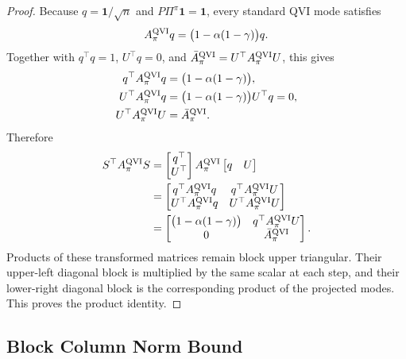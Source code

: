 \documentclass[letterpaper]{article}
\numberwithin{equation}{section}
\begin{document}
\begin{proof}
Because $q=\mathbf{1}/\sqrt n$ and $P\Pi^\pi\mathbf{1}=\mathbf{1}$, every
standard QVI mode satisfies
\begin{align*}
  A_\pi^{\rm QVI}q=\bigl(1-\alpha(1-\gamma)\bigr)q.
\end{align*}
Together with $q^\top q=1$, $U^\top q=0$, and
$\bar A_\pi^{\rm QVI}=U^\top A_\pi^{\rm QVI}U$, this gives
\begin{align*}
  q^\top A_\pi^{\rm QVI}q&=\bigl(1-\alpha(1-\gamma)\bigr),\\
  U^\top A_\pi^{\rm QVI}q&=\bigl(1-\alpha(1-\gamma)\bigr)U^\top q=0,\\
  U^\top A_\pi^{\rm QVI}U&=\bar A_\pi^{\rm QVI}.
\end{align*}
Therefore
\begin{align*}
  S^\top A_\pi^{\rm QVI}S
  &=
  \begin{bmatrix}q^\top\\U^\top\end{bmatrix}
  A_\pi^{\rm QVI}
  \begin{bmatrix}q&U\end{bmatrix}\\
  &=
  \begin{bmatrix}
    q^\top A_\pi^{\rm QVI}q&q^\top A_\pi^{\rm QVI}U\\
    U^\top A_\pi^{\rm QVI}q&U^\top A_\pi^{\rm QVI}U
  \end{bmatrix}\\
  &=
  \begin{bmatrix}
    \bigl(1-\alpha(1-\gamma)\bigr)&q^\top A_\pi^{\rm QVI}U\\
    0&\bar A_\pi^{\rm QVI}
  \end{bmatrix}.
\end{align*}
Products of these transformed matrices remain block upper triangular. Their
upper-left diagonal block is multiplied by the same scalar at each step, and
their lower-right diagonal block is the corresponding product of the projected
modes. This proves the product identity.
\end{proof}

\subsection{Block Column Norm Bound}
\label{app:block-column-norm-bound}
\end{document}
